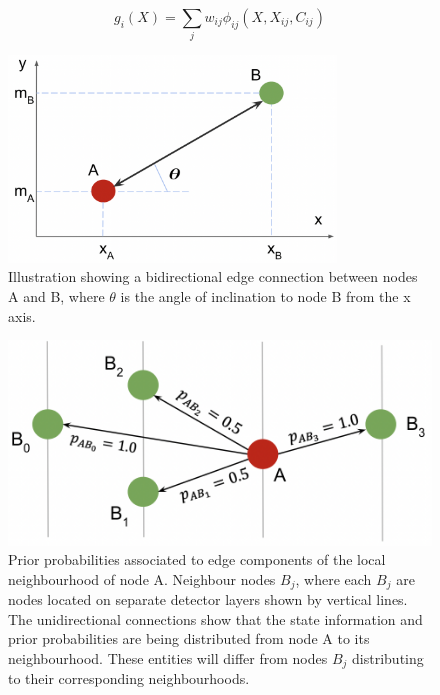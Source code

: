 \begin{equation}
g_i(X) = \sum_{j} w_{ij}\phi_{ij}(X, X_{ij}, C_{ij})
\label{eqn:gaussian-mixture}
\end{equation}


\begin{figure}[htbp]%
    \centering
    \includegraphics[width=8.7cm]{images/5-gnn-algorithm/network-initialisation-1.png}
    \caption{Illustration showing a bidirectional edge connection between nodes A and B, where $\theta$ is the angle of inclination to node B from the x axis.}%
    \label{fig:network-initial-one}%
\end{figure}

\begin{figure}[htbp]%
    \centering
    \includegraphics[width=12cm]{images/5-gnn-algorithm/network-initialisation-2.png}%
    \caption{Prior probabilities associated to edge components of the local neighbourhood of node A. Neighbour nodes $B_j$, where each $B_j$ are nodes located on separate detector layers shown by vertical lines. The unidirectional connections show that the state information and prior probabilities are being distributed from node A to its neighbourhood. These entities will differ from nodes $B_j$ distributing to their corresponding neighbourhoods.}%
    \label{fig:network-initial-two}%
\end{figure}




